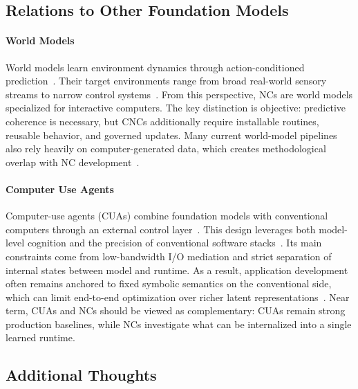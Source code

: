 \subsection{Relations to Other Foundation Models}
\label{sec:relations}
\paragraph{World Models}
World models learn environment dynamics through action-conditioned prediction~\citep{ha2018world}.
Their target environments range from broad real-world sensory streams to narrow control systems~\citep{schmidhuber1990making,feng2023finetuning}.
From this perspective, NCs are world models specialized for interactive computers.
The key distinction is objective: predictive coherence is necessary, but CNCs additionally require installable routines, reusable behavior, and governed updates.
Many current world-model pipelines also rely heavily on computer-generated data, which creates methodological overlap with NC development~\citep{richter2016playing,tobin2017domain,dosovitskiy2017carla,garcia2023robust}.

\paragraph{Computer Use Agents}
Computer-use agents (CUAs) combine foundation models with conventional computers through an external control layer~\citep{openaiComputerUsingAgent,claudeComputerTool,sager2025comprehensivesurveyagentscomputer}.
This design leverages both model-level cognition and the precision of conventional software stacks~\citep{song2025coact1computerusingagentscoding}.
Its main constraints come from low-bandwidth I/O mediation and strict separation of internal states between model and runtime.
As a result, application development often remains anchored to fixed symbolic semantics on the conventional side, which can limit end-to-end optimization over richer latent representations~\citep{liang-etal-2017-neural,hu2017learningreasonendtoendmodule,gaunt2016terpretprobabilisticprogramminglanguage}.
Near term, CUAs and NCs should be viewed as complementary: CUAs remain strong production baselines, while NCs investigate what can be internalized into a single learned runtime.

\subsection{Additional Thoughts}

